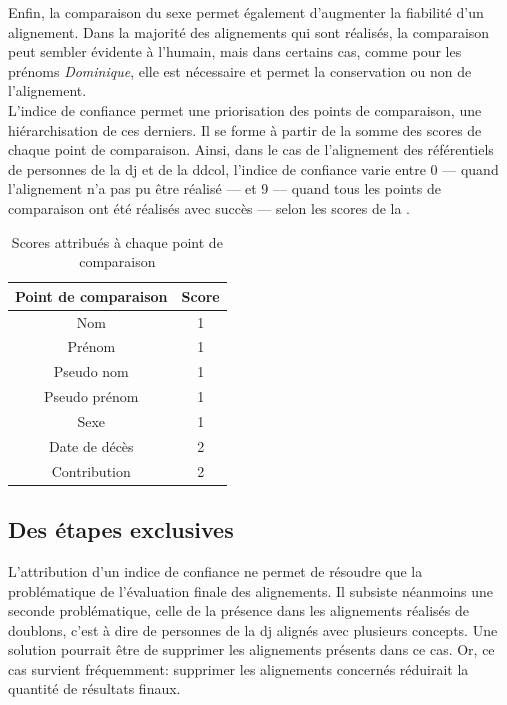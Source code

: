 Enfin, la comparaison du sexe permet également d'augmenter la fiabilité d'un alignement. Dans la majorité des alignements qui sont réalisés, la comparaison peut sembler évidente à l'humain, mais dans certains cas, comme pour les prénoms \textit{Dominique}, elle est nécessaire et permet la conservation ou non de l'alignement.\\

L'indice de confiance permet une priorisation des points de comparaison, une hiérarchisation de ces derniers. Il se forme à partir de la somme des scores de chaque point de comparaison. Ainsi, dans le cas de l'alignement des référentiels de personnes de la \ac{dj} et de la \ac{ddcol}, l'indice de confiance varie entre 0 --- quand l'alignement n'a pas pu être réalisé --- et 9 --- quand tous les points de comparaison ont été réalisés avec succès --- selon les scores de la .
\begin{table}[!h]
	\centering
	\begin{tabular}{|c|c|}
		\hline
		\textbf{Point de comparaison}&\textbf{Score}\\ \hline
		Nom&1\\ \hline
		Prénom&1\\ \hline
		Pseudo nom&1\\ \hline
		Pseudo prénom&1\\ \hline
		Sexe&1\\ \hline
		Date de décès&2\\ \hline
		Contribution&2\\ \hline
	\end{tabular}
	\caption{Scores attribués à chaque point de comparaison}
	\label{table_scores}
\end{table}

\subsection{\label{III-C-2-b}Des étapes exclusives}

L'attribution d'un indice de confiance ne permet de résoudre que la problématique de l'évaluation finale des alignements. Il subsiste néanmoins une seconde problématique, celle de la présence dans les alignements réalisés de doublons, c'est à dire de personnes de la \ac{dj} alignés avec plusieurs concepts. Une solution pourrait être de supprimer les alignements présents dans ce cas. Or, ce cas survient fréquemment: supprimer les alignements concernés réduirait la quantité de résultats finaux.\\

